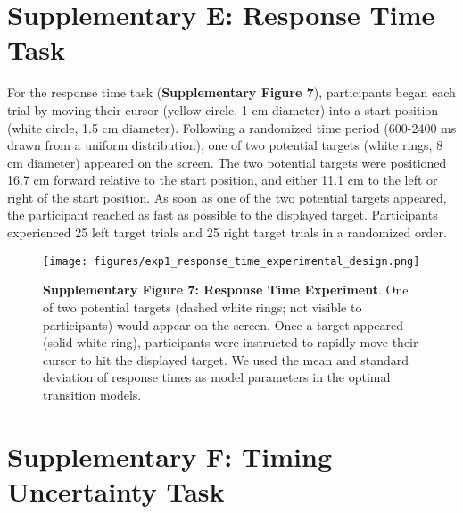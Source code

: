 \documentclass[12pt]{article}
\newcommand\boldblue[1]{\textcolor{mydarkblue}{\textbf{#1}}}
\begin{document}
\newpage
\section{Supplementary E: Response Time Task}

\noindent For the response time task (\boldblue{Supplementary Figure 7}), participants began each trial by moving their cursor (yellow circle, 1 cm diameter) into a start position (white circle, 1.5 cm diameter). Following a randomized time period (600-2400 ms drawn from a uniform distribution), one of two potential targets (white rings, 8 cm diameter) appeared on the screen. The two potential targets were positioned 16.7 cm forward relative to the start position, and either 11.1 cm to the left or right of the start position. As soon as one of the two potential targets appeared, the participant reached as fast as possible to the displayed target. Participants experienced 25 left target trials and 25 right target trials in a randomized order. 
\begin{figure}[H]
    \centering
    \texttt{[image: figures/exp1\_response\_time\_experimental\_design.png]}

    \caption*{\boldblue{Supplementary Figure 7: Response Time Experiment}. One of two potential targets (dashed white rings; not visible to participants) would appear on the screen. Once a target appeared (solid white ring), participants were instructed to rapidly move their cursor to hit the displayed target. We used the mean and standard deviation of response times as model parameters in the optimal transition models.}
\end{figure}

\newpage
\section{Supplementary F: Timing Uncertainty Task}
\end{document}
